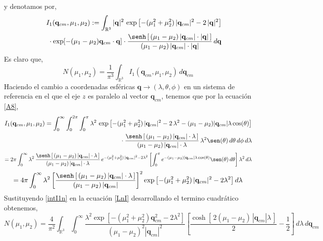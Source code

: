 \documentclass[12pt]{book}
\numberwithin{equation}{chapter}
\def\q{\mathbf{q}}
\def\R{\mathbb{R}}
\def\t{\theta}
\def\p{\phi}
\def\l{\lambda}
\begin{document}
y denotamos por,
\begin{align}\label{In1}
I_{1}(\q_{cm},\mu_{1},\mu_{2}):= 
\int_{\R^{3}}
|\q|^{2}\, \exp \left[ -(\mu_{1}^{2}+\mu_{2}^{2})\, |\q_{cm}|^{2} - 2\,|\q|^{2}
 \right] 
\nonumber\\
\qquad  \vphantom{\int_{\R^{6}}}
\cdot \exp[ -(\mu_{1}-\mu_{2})\q_{cm}\cdot \q ] 
\cdot \frac{ \senh \left[\, (\mu_{1}-\mu_{2})\, |\q_{cm}|\cdot |\q| \, \right]}{ (\mu_{1}-\mu_{2})\, |\q_{cm}|\cdot |\q| }
\,d\q 
\end{align}
Es claro que, 
\begin{equation}\label{LnI}
N(\mu_{1},\mu_{2})= \frac{1}{\pi^{3}} \int_{\R^{3}} I_{1}(\q_{cm},\mu_{1},\mu_{2}) \, d\q_{cm} 
\end{equation}
Haciendo el cambio a coordenadas esf\'ericas $\q \rightarrow (\l, \t,\p) $ en un sistema de referencia en el que el eje $z$ es paralelo al vector $\q_{cm}$, tenemos que por la ecuaci\'on \eqref{A8},
\begin{align}
I_{1}(\q_{cm},\mu_{1},\mu_{2})= 
\int_{0}^{\infty} \int_{0}^{2\pi} \int_{0}^{\pi}
\l^{2} \, \exp \left[ -(\mu_{1}^{2}+\mu_{2}^{2})\, |\q_{cm}|^{2} - 2\, \l^{2}-(\mu_{1}-\mu_{2}) |\q_{cm}|\l \cos(\theta)
 \right] 
\nonumber\\
\qquad  \vphantom{\int_{\R^{3}}}
\cdot \frac{ \senh \left[\, (\mu_{1}-\mu_{2})\, |\q_{cm}|\cdot \l \, \right]}{ (\mu_{1}-\mu_{2})\, |\q_{cm}|\cdot \l }
\, \l^{2} \sen(\t) \, d\t \, d\p \,d \l  \nonumber
\end{align}
$$= 2\pi \int_{0}^{\infty} \l^{2}\, \frac{ \senh \left[\, (\mu_{1}-\mu_{2})\, |\q_{cm}|\cdot \l \, \right]}{ (\mu_{1}-\mu_{2})\, |\q_{cm}|\cdot \l }\, e^{-(\mu_{1}^{2}+\mu_{2}^{2})\, |\q_{cm}|^{2} - 2 \l^{2}} \left[\int_{0}^{\pi} e^{-(\mu_{1}-\mu_{2}) |\q_{cm}|\l \cos(\theta)} \sen (\t) \, d\t \right] \l^{2}\, d\l $$
\begin{equation}\label{intI1n}
= 4\pi \int_{0}^{\infty} \l^{2}  \left[ \frac{ \senh \left[\, (\mu_{1}-\mu_{2})\, |\q_{cm}|\cdot \l \, \right]}{ (\mu_{1}-\mu_{2})\, |\q_{cm}|} \right]^{2} \exp \left[ -(\mu_{1}^{2}+\mu_{2}^{2})\, |\q_{cm}|^{2} - 2 \l^{2} \right] d\l
\end{equation}
Sustituyendo \eqref{intI1n} en la ecuaci\'on \eqref{LnI} desarrollando el termino cuadr\'atico obtenemos,
$$N(\mu_{1},\mu_{2})= \frac{4}{\pi^{2}} \int_{\R^{3}} \int_{0}^{\infty} \frac{\l^{2} \exp \left[ -(\mu_{1}^{2}+\mu_{2}^{2})\q_{cm}^{2} -2\l^{2} \right] }{(\mu_{1}-\mu_{2})^{2} |\q_{cm}|^{2}} \left[ \frac{ \cosh [\, 2(\mu_{1}-\mu_{2})\,|\q_{cm}|\l \,] }{2} - \frac{1}{2} \right]  \,d\l \, d\q_{cm}  $$
\end{document}
